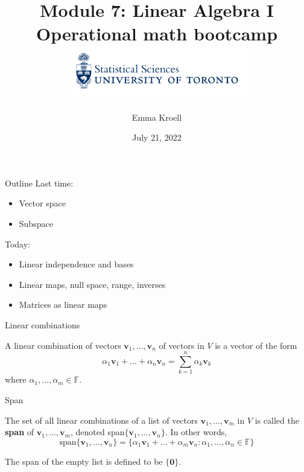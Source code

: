 \documentclass [aspectratio=169]{beamer}
\title[]{Module 7: Linear Algebra I \\ {\large Operational math bootcamp}\\ \includegraphics[width=8cm]{dept_logo.png}\vspace{-1em}}
\author[]{Emma Kroell}
\institute[]{University of Toronto}
\date{July 21, 2022}
\newcommand{\bv}{{\mathbf{v}}}
\newcommand{\zerovec}{{\mathbf{0}}}
\newcommand{\F}{{\mathbb{F}}}
\begin{document}
{
\begin{frame}
    \titlepage
\end{frame}
}

\begin{frame}{Outline}
Last time:
    \begin{itemize}
      \setlength\itemsep{0.5em}
    	\item Vector space
	\item Subspace
    \end{itemize}
    
\vspace{1em}

Today:
    \begin{itemize}
      \setlength\itemsep{0.5em}
    	\item Linear independence and bases
	\item Linear maps, null space, range, inverses
	\item Matrices as linear maps
    \end{itemize}
\end{frame}

\begin{frame}{Linear combinations}
\begin{definition}
A linear combination of vectors $\bv_{1},...,\bv_{n}$ of vectors in $V$ is a vector of the form 
$$
\alpha_{1}\bv_{1}+...+\alpha_{n}\bv_{n} = \sum_{k=1}^n \alpha_k \bv_k
$$
 where $\alpha_{1},...,\alpha_{m} \in \F$.
\end{definition}
\end{frame}

\begin{frame}{Span}
\begin{definition}
The set of all linear combinations of a list of vectors
$\bv_{1},...,\bv_{m}$ in $V$ is called the \textbf{span} of $\bv_{1},...,\bv_{m}$,
denoted span$\{\bv_{1},...,\bv_{n}\}$. In other words, 
$$
\text{span}\{\bv_{1},...,\bv_{n}\}=\{\alpha_{1}\bv_{1}+...+\alpha_{m}\bv_{n} :\alpha_{1},...,\alpha_{n}\in\F\}
$$
\end{definition}
The span of the empty list is defined to be $\{\zerovec\}$.



\end{frame}
\end{document}
